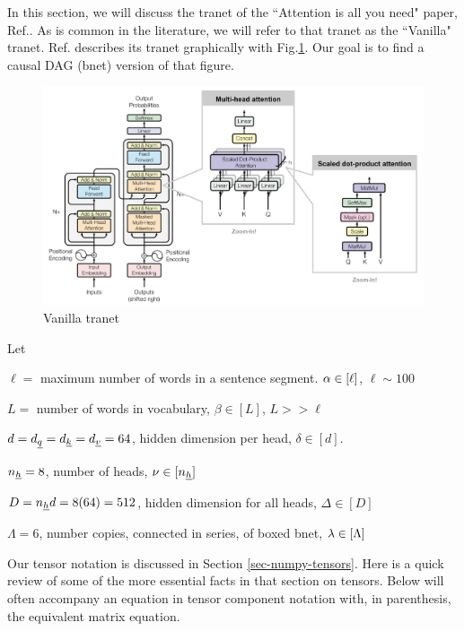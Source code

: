 In this section, we
will discuss
 the tranet of
 the ``Attention is all you need" paper, Ref.\cite{attention-is-all-you-need}.
 As is common in the literature,
 we will refer to that tranet as 
 the ``Vanilla" tranet.
 Ref.\cite{attention-is-all-you-need} describes its tranet 
 graphically with Fig.\ref{fig-vanilla-transformer}.
 Our goal
 is to find a causal DAG (bnet)
 version of that figure.

\begin{figure}[!h]
\centering
\includegraphics[width=6in]
{transformer/transformer.png}
\caption{Vanilla tranet}
\label{fig-vanilla-transformer}
\end{figure}

Let

$\ell=$ maximum number of words in a sentence segment. $\alpha\in [\ell]$, $\ell\sim 100$

$L=$ number of words in vocabulary, $\beta\in[L]$, $L>> \ell$

$d=d_{\underline{q}}=d_{\underline{k}}=d_{\underline{v}}=64$, hidden dimension  per head,
$\delta\in[d]$. 

$n_{\underline{h}}=8$, number of heads, $\nu \in[n_{\underline{h}}]$

$D=n_{\underline{h}} d=8(64)=512$, hidden dimension for all heads,
$\Delta\in [D]$

$\Lambda=6$, number copies,
connected in series,
of boxed bnet, $\lambda\in[\Lambda]$

Our tensor notation is discussed in Section 
\ref{sec-numpy-tensors}.
Here is a quick review
of some of the more essential
facts in that section on tensors.
Below will often accompany 
  an equation in tensor
  component notation
  with, in parenthesis, the equivalent matrix equation.
 
 

